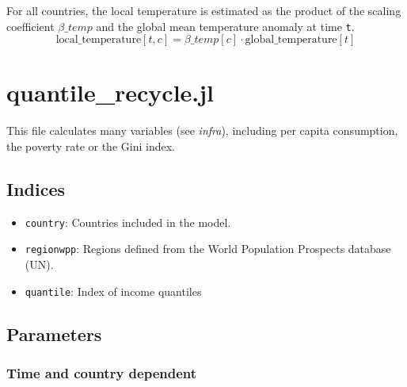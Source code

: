 \documentclass[
]{article}
\providecommand{\tightlist}{%
  \setlength{\itemsep}{0pt}\setlength{\parskip}{0pt}}
\begin{document}
For all countries, the local temperature is estimated as the product of
the scaling coefficient \(\beta\_{temp}\) and the global mean
temperature anomaly at time \texttt{t}.
\begin{equation}
 \text{local\_temperature}[t,c] = \beta\_temp[c] \cdot \text{global\_temperature}[t]
\end{equation}


\section{quantile\_recycle.jl}\label{quantile_recycle.jl}

This file calculates many variables (see \emph{infra}), including per
capita consumption, the poverty rate or the Gini index.

\subsection{Indices}\label{indices}

\begin{itemize}
\tightlist
\item
  \texttt{country}: Countries included in the model.
\item
  \texttt{regionwpp}: Regions defined from the World Population Prospects database (UN).
\item
  \texttt{quantile}: Index of income quantiles
\end{itemize}

\subsection{Parameters}\label{parameters-5}

\subsubsection{Time and country
dependent}\label{time-and-country-dependent-10}
\end{document}
